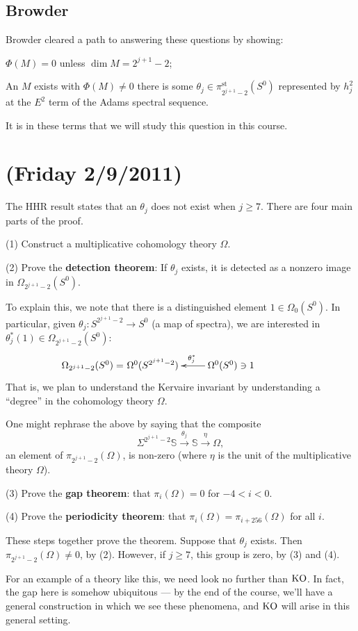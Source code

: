\documentclass[11pt]{article}
\newcommand{\NewLecture}[3]{\section{#1 {\small(#2/#3/2011)}}}
\begin{document}
\subsection*{Browder}
Browder cleared a path to answering these questions by showing:
\begin{itemise}
\item $\Phi(M)=0$ unless $\dim M=2^{j+1}-2$;
\item An $M$ exists with $\Phi(M)\neq0$ \Iff there is some
$\theta_j\in\pi_{2^{j+1}-2}^\text{st}(S^0)$ represented by $h_j^2$ at the $E^2$
term of the Adams spectral sequence.
\end{itemise}
It is in these terms that we will study this question in this course.
\NewLecture{}{Friday 2}{9}
The HHR result states that an $\theta_j$ does not exist when $j\geq7$. There are
four main parts of the proof.
\begin{itemise}
\item[(1)] Construct a multiplicative cohomology theory $\Omega$.
\item[(2)] Prove the \textbf{detection theorem}: If $\theta_j$ exists, it is
detected as a nonzero image in $\Omega_{2^{j+1}-2}(S^0)$.

\INDENT To explain this, we note that there is a distinguished element
$1\in\Omega_0(S^0)$. In particular, given $\theta_j:S^{2^{j+1}-2}\to S^0$ (a map
of spectra), we are interested in $\theta_j^*(1)\in\Omega_{2^{j+1}-2}(S^0)$:
\[\qquad\xymatrix{
\makebox[0cm][r]{$\Omega_{2^{j+1}-2}(S^0)=$\ }\Omega^0(S^{2^{j+1}-2})&
\ar[l]_{\theta_j^*}\Omega^0(S^{0})\ni 1
}\]
That is, we plan to understand the Kervaire invariant by understanding a
``degree'' in the cohomology theory $\Omega$.

One might rephrase the above by saying that the composite
\[\Sigma^{2^{j+1}-2}\mathbb{S}\overset{\theta_j}{\to}\mathbb{S}\overset{\eta}
{\to}\Omega,\]
an element of $\pi_{2^{j+1}-2}(\Omega)$, is non-zero (where $\eta$ is the unit
of the multiplicative theory $\Omega$).
\item[(3)] Prove the \textbf{gap theorem}: that $\pi_i(\Omega)=0$ for $-4<i<0$.
\item[(4)] Prove the \textbf{periodicity theorem}: that
$\pi_i(\Omega)=\pi_{i+256}(\Omega)$ for all $i$.
\end{itemise}
These steps together prove the theorem. Suppose that $\theta_j$ exists. Then
$\pi_{2^{j+1}-2}(\Omega)\neq0$, by (2). However, if $j\geq7$, this group is
zero, by (3) and (4).

For an example of a theory like this, we need look no further than $\operatorname{{KO}}$. In
fact, the gap here is somehow ubiquitous --- by the end of the course, we'll
have a general construction in which we see these phenomena, and $\operatorname{{KO}}$ will
arise in this general setting.
\end{document}
